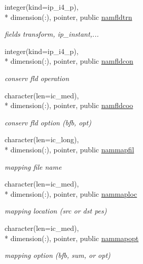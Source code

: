 \begin{DoxyCompactItemize}
integer(kind=ip\+\_\+i4\+\_\+p), \\*
dimension(\+:), pointer, public \hyperlink{classmod__oasis__namcouple_a5f81bc00e6dc045770edd4093f68278c}{namfldtrn}
\begin{DoxyCompactList}\small\item\em fields transform, ip\+\_\+instant,... \end{DoxyCompactList}\item 
integer(kind=ip\+\_\+i4\+\_\+p), \\*
dimension(\+:), pointer, public \hyperlink{classmod__oasis__namcouple_a96aa6a31ef021468f807819a84b327c3}{namfldcon}
\begin{DoxyCompactList}\small\item\em conserv fld operation \end{DoxyCompactList}\item 
character(len=ic\+\_\+med), \\*
dimension(\+:), pointer, public \hyperlink{classmod__oasis__namcouple_a119b86702766d5392cb44856448bcd3e}{namfldcoo}
\begin{DoxyCompactList}\small\item\em conserv fld option (bfb, opt) \end{DoxyCompactList}\item 
character(len=ic\+\_\+long), \\*
dimension(\+:), pointer, public \hyperlink{classmod__oasis__namcouple_a9fc6ac674a8cfa68d9d15ad13213e21d}{nammapfil}
\begin{DoxyCompactList}\small\item\em mapping file name \end{DoxyCompactList}\item 
character(len=ic\+\_\+med), \\*
dimension(\+:), pointer, public \hyperlink{classmod__oasis__namcouple_a7316d7d322da7cf10f315e38c145ebbb}{nammaploc}
\begin{DoxyCompactList}\small\item\em mapping location (src or dst pes) \end{DoxyCompactList}\item 
character(len=ic\+\_\+med), \\*
dimension(\+:), pointer, public \hyperlink{classmod__oasis__namcouple_ad2554b4881fa63780dd5e6fe78d705ef}{nammapopt}
\begin{DoxyCompactList}\small\item\em mapping option (bfb, sum, or opt) \end{DoxyCompactList}\item 

\end{DoxyCompactItemize}
